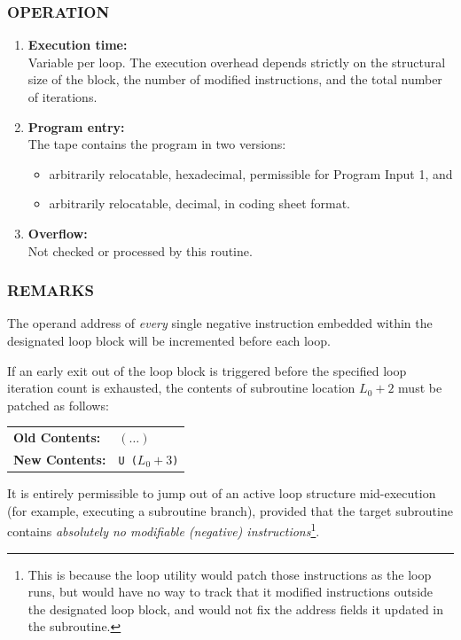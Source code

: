 \subsubsection*{OPERATION}
\begin{enumerate}
    \item \textbf{Execution time:} \\
    Variable per loop. The execution overhead depends strictly on the structural size of the block, the number of modified instructions, and the total number of iterations.
    \item \textbf{Program entry:} \\
    The tape contains the program in two versions:
    \begin{itemize}
        \item[a)] arbitrarily relocatable, hexadecimal, permissible for Program Input 1, and
        \item[b)] arbitrarily relocatable, decimal, in coding sheet format.
    \end{itemize}
    \item \textbf{Overflow:} \\
    Not checked or processed by this routine.
\end{enumerate}

\subsubsection*{REMARKS}
The operand address of \emph{every} single negative instruction embedded within the designated loop block will be incremented before each loop.

If an early exit out of the loop block is triggered before the specified loop iteration count is exhausted, the contents of subroutine location $L_0 + 2$ must be patched as follows:
\begin{center}
\begin{tabular}{ll}
\textbf{Old Contents:} & $(\dots)$ \\
\textbf{New Contents:} & \texttt{U ($L_0 + 3$)} \\
\end{tabular}
\end{center}

It is entirely permissible to jump out of an active loop structure mid-execution (for example, executing a subroutine branch), provided that the target subroutine contains \emph{absolutely no modifiable (negative) instructions}\footnote{This is because the loop utility would patch those instructions as the loop runs, but would have no way to track that it modified instructions outside the designated loop block, and would not fix the address fields it updated in the subroutine.}.

